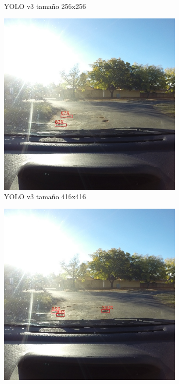\begin{figure}[H]
\begin{subfigure}[h]{0.45\linewidth}
		\caption{YOLO v3 tamaño 256x256}
	\end{subfigure}
	\begin{subfigure}[h]{0.45\linewidth}
		\includegraphics[width=\linewidth]{images/results_b_yolo_v3_416.jpg}
		\caption{YOLO v3 tamaño 416x416}
	\end{subfigure}
	\begin{subfigure}[h]{0.45\linewidth}
		\includegraphics[width=\linewidth]{images/results_b_yolo_v3_640.jpg}

\end{subfigure}
\end{figure}
